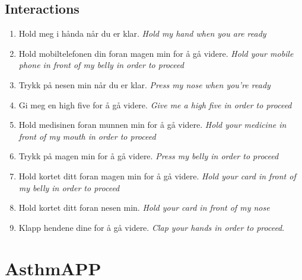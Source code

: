  
\subsection{Interactions}
\label{chp:manus-interactions}
\begin{enumerate}
\item Hold meg i h\r{a}nda n\r{a}r du er klar. \emph{Hold my hand when you are ready}
\item Hold mobiltelefonen din foran magen min for \r{a} g\r{a} videre. \emph{Hold your mobile phone in front of my belly in order to proceed}  
\item Trykk p\r{a} nesen min n\r{a}r du er klar. \emph{Press my nose when you're ready}
\item Gi meg en high five for \r{a} g\r{a} videre.  \emph{Give me a high five in order to proceed}
\item Hold medisinen foran munnen min for \r{a} g\r{a} videre. \emph{Hold your medicine in front of my mouth in order to proceed}
\item Trykk p\r{a} magen min for \r{a} g\r{a} videre. \emph{ Press my belly in order to proceed}
\item Hold kortet ditt foran magen min for \r{a} g\r{a} videre. \emph{ Hold your card in front of my belly in order to proceed}
\item Hold kortet ditt foran nesen min. \emph{Hold your card in front of my nose}
\item Klapp hendene dine for \r{a} g\r{a} videre. \emph{Clap your hands in order to proceed}. 
\end{enumerate}



\section{AsthmAPP}

